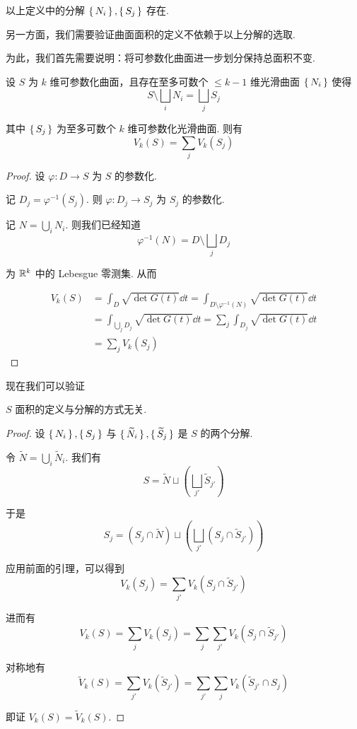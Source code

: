 \begin{property}
    以上定义中的分解 $\set{N_i},\set{S_j}$ 存在.
\end{property}

另一方面，我们需要验证曲面面积的定义不依赖于以上分解的选取.

为此，我们首先需要说明：将可参数化曲面进一步划分保持总面积不变.

\begin{lemma}
    设 $S$ 为 $k$ 维可参数化曲面，且存在至多可数个 $\le k-1$ 维光滑曲面 $\set{N_i}$ 使得
$$
S\setminus\bigsqcup_i N_i=\bigsqcup_jS_j
$$

    其中 $\set{S_j}$ 为至多可数个 $k$ 维可参数化光滑曲面. 则有
$$
V_k(S)=\sum_jV_k(S_j)
$$
\end{lemma}
\begin{proof}
    设 $\varphi:D\to S$ 为 $S$ 的参数化.

    记 $D_j=\varphi^{-1}(S_j)$. 则 $\varphi:D_j\to S_j$ 为 $S_j$ 的参数化.


    记 $N=\bigcup\limits_iN_i$. 则我们已经知道
$$
\varphi^{-1}(N)=D\setminus\bigsqcup_jD_j
$$

    为 $\mathbb{R}^k$ 中的 Lebesgue 零测集. 从而

$$
\begin{aligned}
    V_k(S)&=\int_D\sqrt{\det G(t)}\dd t=\int_{D\setminus\varphi^{-1}(N)}\sqrt{\det G(t)}\dd t\\
    &=\int_{\bigcup\limits_jD_j}\sqrt{\det G(t)}\dd t=\sum_j\int_{D_j}\sqrt{\det G(t)}\dd t\\
    &=\sum_jV_k(S_j)
\end{aligned}
$$
\end{proof}

现在我们可以验证

\begin{property}
    $S$ 面积的定义与分解的方式无关.
\end{property}
\begin{proof}
    设 $\set{N_i},\set{S_j}$ 与 $\set{\widetilde{N}_i},\set{\widetilde{S}_j}$ 是 $S$ 的两个分解.

    令 $\widetilde{N}=\bigcup\limits_i\widetilde{N}_i$. 我们有
$$
S=\widetilde{N}\sqcup\left(\bigsqcup_{j'}\widetilde{S}_{j'}\right)
$$

    于是
$$
S_j=(S_j\cap\widetilde{N})\sqcup\left(\bigsqcup_{j'}(S_j\cap\widetilde{S}_{j'})\right)
$$

    应用前面的引理，可以得到
$$
V_k(S_j)=\sum_{j'}V_k(S_j\cap\widetilde{S}_{j'})
$$


    进而有
$$
V_k(S)=\sum_jV_k(S_j)=\sum_j\sum_{j'}V_k(S_j\cap\widetilde{S}_{j'})
$$

    对称地有
$$
\widetilde{V}_k(S)=\sum_{j'}V_k(\widetilde{S}_{j'})=\sum_{j'}\sum_jV_k(\widetilde{S}_{j'}\cap S_j)
$$

    即证 $V_k(S)=\widetilde{V}_k(S)$.
\end{proof}

